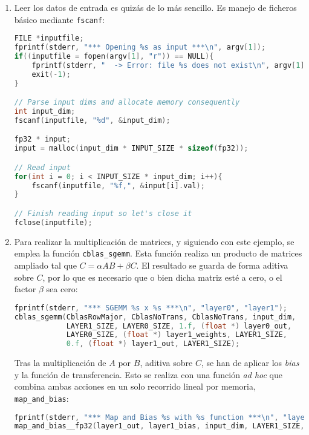 \begin{enumerate}
    \item Leer los datos de entrada es quizás de lo más sencillo. Es manejo de ficheros básico mediante \texttt{fscanf}:\medskip
\begin{lstlisting}[language=C]
FILE *inputfile;
fprintf(stderr, "*** Opening %s as input ***\n", argv[1]);
if((inputfile = fopen(argv[1], "r")) == NULL){
    fprintf(stderr, "  -> Error: file %s does not exist\n", argv[1]);
    exit(-1);
}

// Parse input dims and allocate memory consequently
int input_dim;
fscanf(inputfile, "%d", &input_dim);

fp32 * input;
input = malloc(input_dim * INPUT_SIZE * sizeof(fp32));

// Read input
for(int i = 0; i < INPUT_SIZE * input_dim; i++){
    fscanf(inputfile, "%f,", &input[i].val);
}

// Finish reading input so let's close it
fclose(inputfile);
\end{lstlisting}

    \item Para realizar la multiplicación de matrices, y siguiendo con este ejemplo, se emplea la función \texttt{cblas\_sgemm}. Esta función realiza un producto de matrices ampliado tal que $C = \alpha AB + \beta C$. El resultado se guarda de forma aditiva sobre $C$, por lo que es necesario que o bien dicha matriz esté a cero, o el factor $\beta$ sea cero:\medskip
\begin{lstlisting}[language=C]
fprintf(stderr, "*** SGEMM %s x %s ***\n", "layer0", "layer1");
cblas_sgemm(CblasRowMajor, CblasNoTrans, CblasNoTrans, input_dim,
            LAYER1_SIZE, LAYER0_SIZE, 1.f, (float *) layer0_out,
            LAYER0_SIZE, (float *) layer1_weights, LAYER1_SIZE,
            0.f, (float *) layer1_out, LAYER1_SIZE);
\end{lstlisting}

    Tras la multiplicación de $A$ por $B$, aditiva sobre $C$, se han de aplicar los \textit{bias} y la función de transferencia. Esto se realiza con una función \textit{ad hoc} que combina ambas acciones en un solo recorrido lineal por memoria, \texttt{map\_and\_bias}:\medskip
\begin{lstlisting}[language=C]
fprintf(stderr, "*** Map and Bias %s with %s function ***\n", "layer1_out", "sigmoid__fp32");
map_and_bias__fp32(layer1_out, layer1_bias, input_dim, LAYER1_SIZE, 'N', sigmoid__fp32);
\end{lstlisting}


\end{enumerate}

